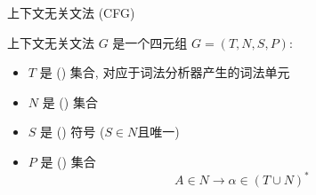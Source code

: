 
\begin{frame}{}
\end{frame}

\begin{frame}{}

  \begin{center}
    上下文无关文法 (CFG)
  \end{center}
\end{frame}

\begin{frame}{}
  \begin{definition}
    上下文无关文法 $G$ 是一个四元组 $G = (T, N, S, P)$:
    \vspace{0.30cm}

    \begin{itemize}
      \setlength{\itemsep}{8pt}
      \item $T$ 是 () 集合, 对应于词法分析器产生的词法单元
      \item $N$ 是 () 集合
      \item $S$ 是 () 符号 ($S \in N$且唯一)
      \item $P$ 是 () 集合
        \[
          \boxed{A \in N \longrightarrow \alpha \in (T \cup N)^{\ast}}
        \]
        \vspace{-0.60cm}
    \end{itemize}
  \end{definition}
\end{frame}

\begin{frame}{}
  

  \begin{columns}
      \pause
      
      \pause
      
  \end{columns}
\end{frame}

